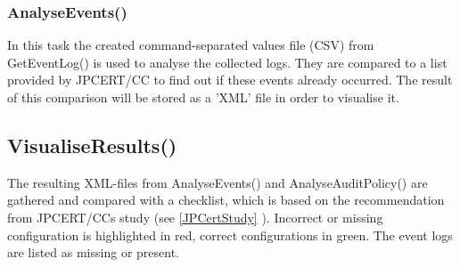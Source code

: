 \subsubsection{AnalyseEvents()}
In this task the created command-separated values file (CSV) from GetEventLog() is used to analyse the collected logs. They are compared to a list provided by JPCERT/CC to find out if these events already occurred. The result of this comparison will be stored as a 'XML' file in order to visualise it.

\subsection{VisualiseResults()}
The resulting XML-files from AnalyseEvents() and AnalyseAuditPolicy() are gathered and compared with a checklist, which is based on the recommendation from JPCERT/CCs study (see \ref{JPCertStudy} ). Incorrect or missing configuration is highlighted in red, correct configurations in green. The event logs are listed as missing or present.

